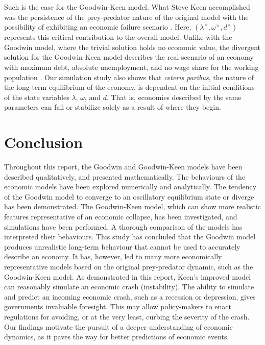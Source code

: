 \documentclass[12pt, centerh1]{article}
\begin{document}
Such is the case for the Goodwin-Keen model. What Steve Keen accomplished was the persistence of the prey-predator nature of the original model with the possibility of exhibiting an economic failure scenario \citep{keen1995finance}. Here, $(\lambda^\times, \omega^\times, d^\times)$ represents this critical contribution to the overall model. Unlike with the Goodwin model, where the trivial solution holds no economic value, the divergent solution for the Goodwin-Keen model describes the real scenario of an economy with maximum debt, absolute unemployment, and no wage share for the working population \citep{minsky1992financial}. Our simulation study also shows that \emph{ceteris paribus}, the nature of the long-term equilibrium of the economy, is dependent on the initial conditions of the state variables $\lambda$, $\omega$, and $d$. That is, economies described by the same parameters can fail or stabilize solely as a result of where they begin.


\section{Conclusion}
Throughout this report, the Goodwin and Goodwin-Keen models have been described qualitatively, and presented mathematically. The behaviours of the economic models have been explored numerically and analytically. The tendency of the Goodwin model to converge to an oscillatory equilibrium state or diverge has been demonstrated. The Goodwin-Keen model, which can show more realistic features representative of an economic collapse, has been investigated, and simulations have been performed. A thorough comparison of the models has interpreted their behaviours. This study has concluded that the Goodwin model produces unrealistic long-term behaviour that cannot be used to accurately describe an economy. It has, however, led to many more economically representative models based on the original prey-predator dynamic, such as the Goodwin-Keen model. As demonstrated in this report, Keen's improved model can reasonably simulate an economic crash (instability). The ability to simulate and predict an incoming economic crash, such as a recession or depression, gives governments invaluable foresight. This may allow policy-makers to enact regulations for avoiding, or at the very least, curbing the severity of the crash. Our findings motivate the pursuit of a deeper understanding of economic dynamics, as it paves the way for better predictions of economic events.
\end{document}
